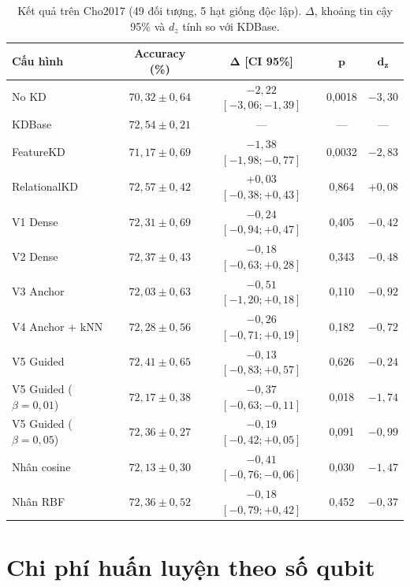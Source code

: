 \begin{table}[!htbp]
\centering
\caption{Kết quả trên Cho2017 (49 đối tượng, 5 hạt giống độc lập). $\Delta$, khoảng tin cậy 95\% và $d_z$ tính so với KDBase.}
\label{tab:cho2017}
\small
\begin{tabular}{lcccc}
\toprule
\textbf{Cấu hình} & \textbf{Accuracy (\%)} & $\boldsymbol{\Delta}$ \textbf{[CI 95\%]} & $\boldsymbol{p}$ & $\boldsymbol{d_z}$ \\
\midrule
No KD & $70{,}32 \pm 0{,}64$ & $-2{,}22$ $[-3{,}06; -1{,}39]$ & 0,0018 & $-3{,}30$ \\
KDBase & $72{,}54 \pm 0{,}21$ & --- & --- & --- \\
FeatureKD & $71{,}17 \pm 0{,}69$ & $-1{,}38$ $[-1{,}98; -0{,}77]$ & 0,0032 & $-2{,}83$ \\
RelationalKD & $72{,}57 \pm 0{,}42$ & $+0{,}03$ $[-0{,}38; +0{,}43]$ & 0,864 & $+0{,}08$ \\
\midrule
V1 Dense & $72{,}31 \pm 0{,}69$ & $-0{,}24$ $[-0{,}94; +0{,}47]$ & 0,405 & $-0{,}42$ \\
V2 Dense & $72{,}37 \pm 0{,}43$ & $-0{,}18$ $[-0{,}63; +0{,}28]$ & 0,343 & $-0{,}48$ \\
V3 Anchor & $72{,}03 \pm 0{,}63$ & $-0{,}51$ $[-1{,}20; +0{,}18]$ & 0,110 & $-0{,}92$ \\
V4 Anchor $+$ kNN & $72{,}28 \pm 0{,}56$ & $-0{,}26$ $[-0{,}71; +0{,}19]$ & 0,182 & $-0{,}72$ \\
V5 Guided & $72{,}41 \pm 0{,}65$ & $-0{,}13$ $[-0{,}83; +0{,}57]$ & 0,626 & $-0{,}24$ \\
V5 Guided ($\beta = 0{,}01$) & $72{,}17 \pm 0{,}38$ & $-0{,}37$ $[-0{,}63; -0{,}11]$ & 0,018 & $-1{,}74$ \\
V5 Guided ($\beta = 0{,}05$) & $72{,}36 \pm 0{,}27$ & $-0{,}19$ $[-0{,}42; +0{,}05]$ & 0,091 & $-0{,}99$ \\
\midrule
Nhân cosine & $72{,}13 \pm 0{,}30$ & $-0{,}41$ $[-0{,}76; -0{,}06]$ & 0,030 & $-1{,}47$ \\
Nhân RBF & $72{,}36 \pm 0{,}52$ & $-0{,}18$ $[-0{,}79; +0{,}42]$ & 0,452 & $-0{,}37$ \\
\bottomrule
\end{tabular}
\end{table}
\FloatBarrier

\section{Chi phí huấn luyện theo số qubit}
\label{app:qubit}

